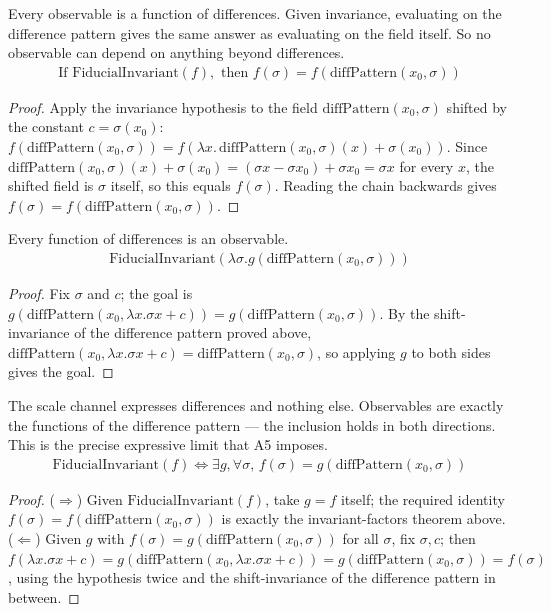 \begin{theorem}
Every observable is a function of differences.  Given invariance, evaluating on the difference pattern gives the same answer as evaluating on the field itself.  So no observable can depend on anything beyond differences.
\begin{align*}
\text{If } \text{FiducialInvariant}(f), \text{ then } f(\sigma) = f(\text{diffPattern}(x_0, \sigma))
\end{align*}
\begin{proof}
Apply the invariance hypothesis to the field $\text{diffPattern}(x_0,\sigma)$ shifted by the constant $c=\sigma(x_0)$: $f(\text{diffPattern}(x_0,\sigma)) = f(\lambda x.\,\text{diffPattern}(x_0,\sigma)(x) + \sigma(x_0))$. Since $\text{diffPattern}(x_0,\sigma)(x)+\sigma(x_0) = (\sigma x - \sigma x_0) + \sigma x_0 = \sigma x$ for every $x$, the shifted field is $\sigma$ itself, so this equals $f(\sigma)$. Reading the chain backwards gives $f(\sigma)=f(\text{diffPattern}(x_0,\sigma))$.
\end{proof}
\end{theorem}

\begin{theorem}
Every function of differences is an observable.
\begin{align*}
\text{FiducialInvariant}(\lambda \sigma. g(\text{diffPattern}(x_0, \sigma)))
\end{align*}
\begin{proof}
Fix $\sigma$ and $c$; the goal is $g(\text{diffPattern}(x_0,\lambda x.\sigma x+c)) = g(\text{diffPattern}(x_0,\sigma))$. By the shift-invariance of the difference pattern proved above, $\text{diffPattern}(x_0,\lambda x.\sigma x+c)=\text{diffPattern}(x_0,\sigma)$, so applying $g$ to both sides gives the goal.
\end{proof}
\end{theorem}

\begin{theorem}
The scale channel expresses differences and nothing else.  Observables are exactly the functions of the difference pattern — the inclusion holds in both directions.  This is the precise expressive limit that A5 imposes.
\begin{align*}
\text{FiducialInvariant}(f) \Leftrightarrow \exists g, \forall \sigma, \, f(\sigma) = g(\text{diffPattern}(x_0, \sigma))
\end{align*}
\begin{proof}
($\Rightarrow$) Given $\text{FiducialInvariant}(f)$, take $g=f$ itself; the required identity $f(\sigma)=f(\text{diffPattern}(x_0,\sigma))$ is exactly the invariant-factors theorem above. ($\Leftarrow$) Given $g$ with $f(\sigma)=g(\text{diffPattern}(x_0,\sigma))$ for all $\sigma$, fix $\sigma,c$; then $f(\lambda x.\sigma x+c) = g(\text{diffPattern}(x_0,\lambda x.\sigma x+c)) = g(\text{diffPattern}(x_0,\sigma)) = f(\sigma)$, using the hypothesis twice and the shift-invariance of the difference pattern in between.
\end{proof}
\end{theorem}

